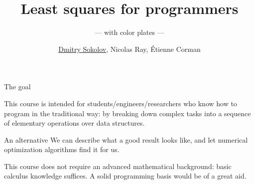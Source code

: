 \documentclass[UKenglish,aspectratio=169]{beamer}
\author[Dmitry Sokolov]{\underline{Dmitry Sokolov}, Nicolas Ray, Étienne Corman}
\title{Least squares for programmers}
\subtitle{--- with color plates ---}
\begin{document}


\begin{frame}{The goal}

This course is intended for students/engineers/researchers who know how to program in the traditional way:
by breaking down complex tasks into a sequence of elementary operations over data structures.

\vspace{2ex}

\begin{block}{An alternative}
We can describe what a good result looks like, and let numerical optimization algorithms find it for us.
\end{block}

\vspace{2ex}

This course does not require an advanced mathematical background: basic calculus knowledge suffices. A solid programming basis would be of a great aid.
\end{frame}
\end{document}
